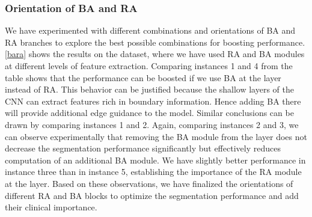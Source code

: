 \documentclass[review]{elsarticle}
\begin{document}
\subsubsection{Orientation of BA and RA}
We have experimented with different combinations and orientations of BA and RA branches to explore the best possible combinations for boosting performance. \autoref{bara} shows the results on the  dataset, where we have used RA and BA modules at different levels of feature extraction. Comparing instances 1 and 4 from the table shows that the performance can be boosted if we use BA at the  layer instead of RA. This behavior can be justified because the shallow layers of the CNN can extract features rich in boundary information. Hence adding BA there will provide additional edge guidance to the model. Similar conclusions can be drawn by comparing instances 1 and 2. Again, comparing instances 2 and 3, we can observe experimentally that removing the BA module from the  layer does not decrease the segmentation performance significantly but effectively reduces computation of an additional BA module. We have slightly better performance in instance three than in instance 5, establishing the importance of the RA module at the  layer. Based on these observations, we have finalized the orientations of different RA and BA blocks to optimize the segmentation performance and add their clinical importance.
\end{document}
